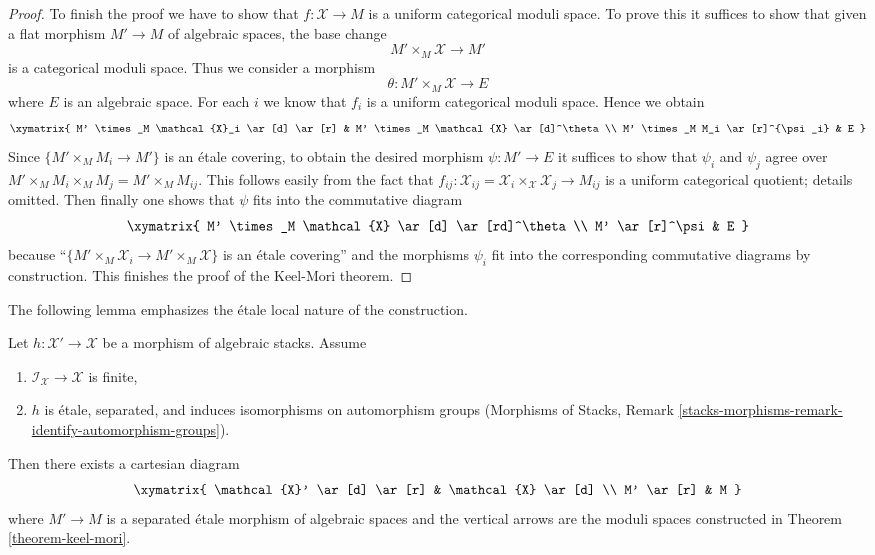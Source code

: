 \begin{proof}
\medskip\noindent
To finish the proof we have to show that $f : \mathcal{X} \to M$
is a uniform categorical moduli space.
To prove this it suffices to show that given a flat morphism
$M' \to M$ of algebraic spaces, the base change
$$
M' \times_M \mathcal{X} \longrightarrow M'
$$
is a categorical moduli space. Thus we consider a morphism
$$
\theta : M' \times_M \mathcal{X} \longrightarrow E
$$
where $E$ is an algebraic space. For each $i$ we know that
$f_i$ is a uniform categorical moduli space. Hence we obtain
$$
\xymatrix{
M' \times_M \mathcal{X}_i \ar[d] \ar[r] &
M' \times_M \mathcal{X} \ar[d]^\theta \\
M' \times_M M_i \ar[r]^{\psi_i} &
E
}
$$
Since $\{M' \times_M M_i \to M'\}$ is an \'etale covering,
to obtain the desired morphism $\psi : M' \to E$ it suffices
to show that $\psi_i$ and $\psi_j$ agree over
$M' \times_M M_i \times_M M_j = M' \times_M M_{ij}$.
This follows easily from the fact that
$f_{ij} : \mathcal{X}_{ij} =
\mathcal{X}_i \times_\mathcal{X} \mathcal{X}_j \to M_{ij}$ is a uniform
categorical quotient; details omitted.
Then finally one shows that $\psi$ fits into the commutative diagram
$$
\xymatrix{
M' \times_M \mathcal{X} \ar[d] \ar[rd]^\theta \\
M' \ar[r]^\psi &
E
}
$$
because ``$\{M' \times_M \mathcal{X}_i \to M' \times_M \mathcal{X}\}$
is an \'etale covering'' and the morphisms $\psi_i$ fit into the
corresponding commutative diagrams by construction.
This finishes the proof of the Keel-Mori theorem.
\end{proof}

\noindent
The following lemma emphasizes the \'etale local nature of the construction.

\begin{lemma}
\label{lemma-etale-separated-over-keel-mori}
Let $h : \mathcal{X}' \to \mathcal{X}$ be a morphism of algebraic stacks.
Assume
\begin{enumerate}
\item $\mathcal{I}_\mathcal{X} \to \mathcal{X}$ is finite,
\item $h$ is \'etale, separated, and induces isomorphisms on
automorphism groups (Morphisms of Stacks, Remark
\ref{stacks-morphisms-remark-identify-automorphism-groups}).
\end{enumerate}
Then there exists a cartesian diagram
$$
\xymatrix{
\mathcal{X}' \ar[d] \ar[r] &
\mathcal{X} \ar[d] \\
M' \ar[r] &
M
}
$$
where $M' \to M$ is a separated \'etale morphism of algebraic spaces and
the vertical arrows are the moduli spaces constructed in
Theorem \ref{theorem-keel-mori}.
\end{lemma}

